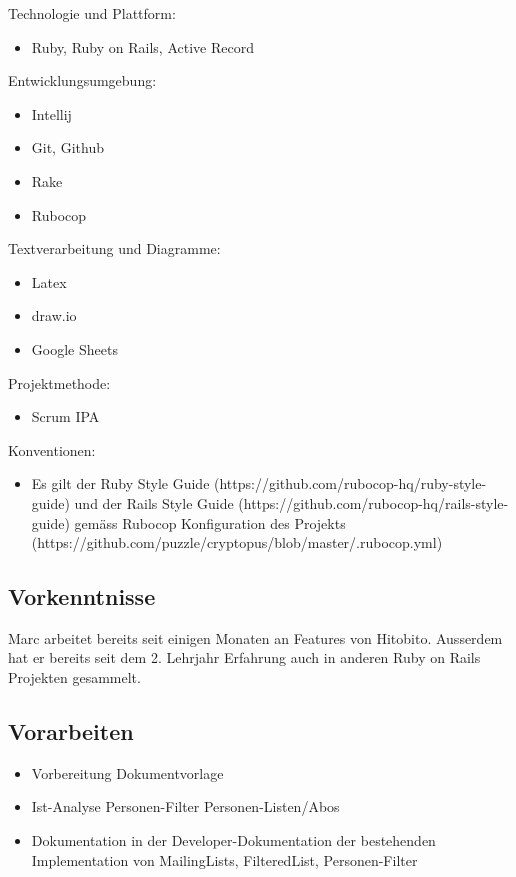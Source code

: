 Technologie und Plattform:

\begin{itemize}
    \item Ruby, Ruby on Rails, Active Record
\end{itemize}

Entwicklungsumgebung:

\begin{itemize}
    \item Intellij
    \item Git, Github
    \item Rake
    \item Rubocop
\end{itemize}

Textverarbeitung und Diagramme:

\begin{itemize}
    \item Latex
    \item draw.io
    \item Google Sheets
\end{itemize}

Projektmethode:

\begin{itemize}
    \item Scrum IPA
\end{itemize}

Konventionen:

\begin{itemize}
    \item Es gilt der Ruby Style Guide (https://github.com/rubocop-hq/ruby-style-guide) und der Rails Style Guide (https://github.com/rubocop-hq/rails-style-guide) gemäss Rubocop Konfiguration des Projekts (https://github.com/puzzle/cryptopus/blob/master/.rubocop.yml)
\end{itemize}

\subsection{Vorkenntnisse}
Marc arbeitet bereits seit einigen Monaten an Features von Hitobito. Ausserdem hat er bereits seit dem 2. Lehrjahr Erfahrung auch in anderen Ruby on Rails Projekten gesammelt.

\subsection{Vorarbeiten}
\begin{itemize}
    \item Vorbereitung Dokumentvorlage
    \item Ist-Analyse Personen-Filter Personen-Listen/Abos
    \item Dokumentation in der Developer-Dokumentation der bestehenden Implementation von MailingLists, FilteredList, Personen-Filter
\end{itemize}

